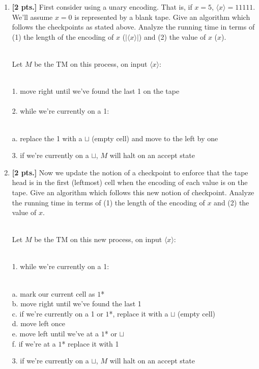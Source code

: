 \documentclass[11pt]{article}
\theoremstyle{definition}
\theoremstyle{theorem}
\newcommand{\solution}{\medskip\noindent{\color{blue}\textbf{Solution:}}}
\begin{document}
\begin{enumerate}[label=(\alph*)]

\item \textbf{[2 pts.]} First consider using a unary encoding. That is, if $x = 5$, $\langle x \rangle = 11111$. We'll assume $x=0$ is represented by a blank tape. Give an algorithm which follows the checkpoints as stated above. Analyze the running time in terms of (1) the length of the encoding of $x$ ($|\langle x \rangle|$) and (2) the value of $x$ ($x$).

\solution\\
Let $M$ be the TM on this process, on input $\langle x \rangle$: \\~\\
\hspace*{0.5cm}
\begin{minipage}{0.9\textwidth}
1. move right until we've found the last 1 on the tape   \\~\\
2. while we're currently on a 1: \\~\\
\hspace*{0.54cm}
\begin{minipage}{0.9\textwidth}
	a. replace the 1 with a $\sqcup$ (empty cell) and move to the left by one \\
\end{minipage}
3. if we're currently on a $\sqcup$, $M$ will halt on an accept state  
\end{minipage}


\item \textbf{[2 pts.]} Now we update the notion of a checkpoint to enforce that the tape head is in the first (leftmost) cell when the encoding of each value is on the tape.
Give an algorithm which follows this new notion of checkpoint. Analyze the running time in terms of (1) the length of the encoding of $x$ and (2) the value of $x$.

\solution \\
Let $M$ be the TM on this new process, on input $\langle x \rangle$: \\~\\
\hspace*{0.5cm}
\begin{minipage}{0.9\textwidth}
1. while we're currently on a 1: \\~\\
\hspace*{0.54cm}
\begin{minipage}{0.9\textwidth}
	a. mark our current cell as $1$* \\
	b. move right until we've found the last 1 \\
	c. if we're currently on a 1 or $1$*, replace it with a $\sqcup$ (empty cell) \\
	d. move left once \\
	e. move left until we've at a $1$* or $\sqcup$ \\
	f. if we're at a $1$* replace it with 1 \\
\end{minipage}
3. if we're currently on a $\sqcup$, $M$ will halt on an accept state    
\end{minipage}



\end{enumerate}
\end{document}

